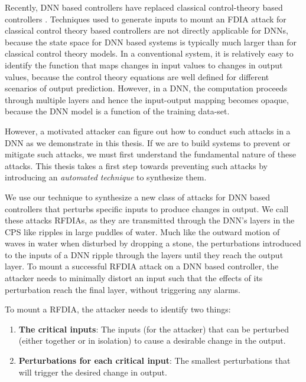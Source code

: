 Recently,  \ac{DNN} based controllers have replaced classical control-theory based controllers \cite{xiang18} \cite{Kocic2019} \cite{bechtel2017deeppicar}.  
Techniques used to generate inputs to mount an FDIA attack for classical control theory based controllers are not directly applicable for DNNs, because the state space for DNN based systems is typically much larger than for classical control theory models. 
In a conventional system, it is relatively easy to identify the function that maps changes in input values to changes in output values, because the control theory equations are well defined for different scenarios of output prediction.
However, in a \ac{DNN}, the computation proceeds through multiple layers and hence the input-output mapping becomes opaque, because the \ac{DNN} model is a function of the training data-set.

However, a motivated attacker can figure out how to conduct such attacks in a \ac{DNN} as we demonstrate in this thesis. 
If we are to build systems to prevent or mitigate such attacks, we must first understand the fundamental nature of these attacks. 
This thesis takes a first step towards preventing such attacks by introducing an {\em automated technique} to synthesize them. 

We use our technique to synthesize a new class of attacks for \ac{DNN} based controllers that perturbs specific inputs to produce changes in output. 
We call these attacks \ac{RFDIA}s, as they are transmitted through the DNN's layers in the CPS like ripples in large puddles of water. 
Much like the outward motion of waves in water when disturbed by dropping a stone, the perturbations introduced to the inputs of a DNN ripple through the layers until they reach the output layer. 
To mount a successful \ac{RFDIA} attack on a DNN based controller, the attacker needs to minimally distort an input such that the effects of its perturbation reach the final layer, without triggering any alarms. 

To mount a \ac{RFDIA}, the attacker needs to identify two things: 
\begin{enumerate}
	\item \textbf{The critical inputs}: The inputs (for the attacker) that can be perturbed (either together or in isolation) to cause a desirable change in the output.
	\item \textbf{Perturbations for each critical input}: The smallest perturbations that will trigger the desired change in output. 
\end{enumerate}

